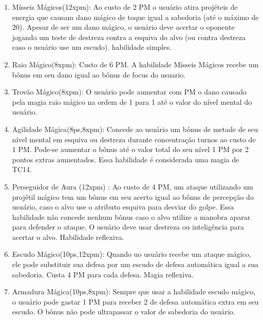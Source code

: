\begin{enumerate}
	 	\item Mísseis Mágicos(12xpm): Ao custo de 2 PM o usuário atira projéteis de energia que causam dano mágico de toque igual a sabedoria (até o máximo de 20). Apesar de ser um dano mágico, o usuário deve acertar o oponente jogando um teste de destreza contra a esquiva do alvo (ou contra destreza caso o usuário use um escudo). habilidade simples.

 	\item Raio Mágico(8xpm): Custo de 6 PM.
A habilidade Mísseis Mágicos recebe um bônus em seu dano igual ao bônus de focus do usuario. 

 	\item Trovão Mágico(8xpm): O usuário pode aumentar com PM o dano causado pela magia raio mágico na ordem de 1 para 1 até o valor do nível mental do usuário.  
  
  	 	\item Agilidade Mágica(8ps,8xpm): Concede ao usuário um bônus de metade de seu nível  mental em esquiva ou destreza durante concentração turnos ao custo de 1 PM. Pode-se aumentar o bônus até o valor total do seu nível 1 PM por 2 pontos extras aumentados. Essa habilidade é considerada uma magia de TC14.  	
			
			  	 	\item Perseguidor de Aura (12xpm) : Ao custo de 4 PM, um ataque utilizando um projétil mágico tem um bônus em seu acerto igual ao bônus de percepção do usuário, caso o alvo use o atributo esquiva para desviar do golpe. Essa habilidade não concede nenhum bônus caso o alvo utilize a manobra aparar para defender o ataque. O usuário deve usar destreza ou inteligência para acertar o alvo. Habilidade reflexiva. 
  	  
  	 	\item Escudo Mágico(10ps,12xpm): Quando uo usuário recebe um ataque mágico, ele pode substituir sua defesa por um escudo de defesa automática igual a sua sabedoria. Custa 4 PM para cada defesa. Magia reflexiva.

  	 	\item Armadura Mágica(10ps,8xpm): Sempre que usar a habilidade escudo mágico, o usuário pode gastar 1 PM para receber 2 de defesa automática extra em seu escudo. O bônus não pode ultrapassar o valor de sabedoria do usuário.
  
  

\end{enumerate}
